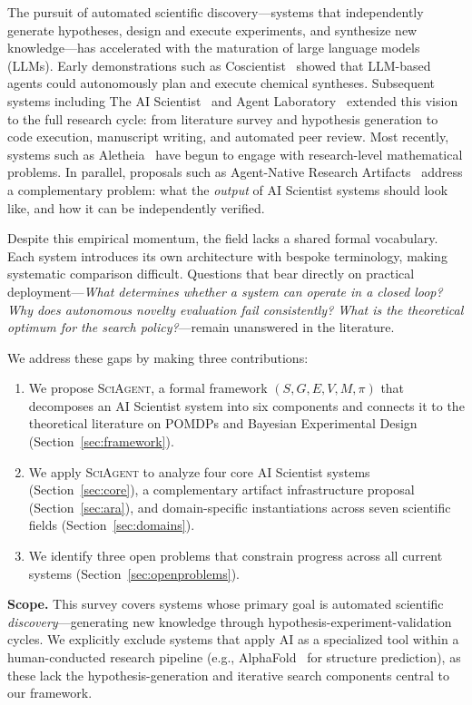 \documentclass[11pt]{article}
\newcommand{\sgmvpi}{$(S, G, E, V, M, \pi)$}
\newcommand{\framework}{\textsc{SciAgent}}
\begin{document}
The pursuit of automated scientific discovery---systems that independently generate hypotheses, design and execute experiments, and synthesize new knowledge---has accelerated with the maturation of large language models (LLMs). Early demonstrations such as Coscientist~\citep{boiko2023emergent} showed that LLM-based agents could autonomously plan and execute chemical syntheses. Subsequent systems including The AI Scientist~\citep{lu2024aiscientist} and Agent Laboratory~\citep{schmidgall2025agentlab} extended this vision to the full research cycle: from literature survey and hypothesis generation to code execution, manuscript writing, and automated peer review. Most recently, systems such as Aletheia~\citep{google2026aletheia} have begun to engage with research-level mathematical problems. In parallel, proposals such as Agent-Native Research Artifacts~\citep{liu2026lasthuman} address a complementary problem: what the \emph{output} of AI Scientist systems should look like, and how it can be independently verified.

Despite this empirical momentum, the field lacks a shared formal vocabulary. Each system introduces its own architecture with bespoke terminology, making systematic comparison difficult. Questions that bear directly on practical deployment---\textit{What determines whether a system can operate in a closed loop? Why does autonomous novelty evaluation fail consistently? What is the theoretical optimum for the search policy?}---remain unanswered in the literature.

We address these gaps by making three contributions:

\begin{enumerate}
  \item We propose \framework{}, a formal framework \sgmvpi{} that decomposes an AI Scientist system into six components and connects it to the theoretical literature on POMDPs and Bayesian Experimental Design (Section~\ref{sec:framework}).
  \item We apply \framework{} to analyze four core AI Scientist systems (Section~\ref{sec:core}), a complementary artifact infrastructure proposal (Section~\ref{sec:ara}), and domain-specific instantiations across seven scientific fields (Section~\ref{sec:domains}).
  \item We identify three open problems that constrain progress across all current systems (Section~\ref{sec:openproblems}).
\end{enumerate}

\noindent\textbf{Scope.} This survey covers systems whose primary goal is automated scientific \emph{discovery}---generating new knowledge through hypothesis-experiment-validation cycles. We explicitly exclude systems that apply AI as a specialized tool within a human-conducted research pipeline (e.g., AlphaFold~\citep{jumper2021alphafold} for structure prediction), as these lack the hypothesis-generation and iterative search components central to our framework.
\end{document}
